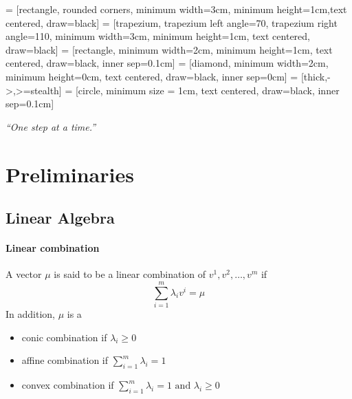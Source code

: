 
\usepackage{makecell}

\usetikzlibrary{shapes.geometric, arrows}
     = [rectangle, rounded corners, minimum width=3cm, minimum height=1cm,text centered, draw=black]
     = [trapezium, trapezium left angle=70, trapezium right angle=110, minimum width=3cm, minimum height=1cm, text centered, draw=black]
     = [rectangle, minimum width=2cm, minimum height=1cm, text centered, draw=black, inner sep=0.1cm]
     = [diamond, minimum width=2cm, minimum height=0cm, text centered, draw=black, inner sep=0cm]
     = [thick,->,>=stealth]
     = [circle, minimum size = 1cm, text centered, draw=black, inner sep=0.1cm]

\renewcommand{\docTitle}{Lecture 1 - Simplex Method}
\renewcommand{\docAuthor}{Lan Peng, Ph.D.}
\renewcommand{\docAffil}{School of Management, Shanghai University, Shanghai, China}

    \titleSec

    \begin{center}
        \textit{``One step at a time.''}
    \end{center}

    \section{Preliminaries}
        \subsection{Linear Algebra}
            \paragraph{Linear combination}
                A vector $\mu$ is said to be a linear combination of $v^1, v^2, \dots, v^m$ if
                \begin{equation*}
                    \sum_{i=1}^m\lambda_i v^i=\mu
                \end{equation*}
                In addition, $\mu$ is a 
                \begin{itemize}
                    \item conic combination if $\lambda_i \ge 0$
                    \item affine combination if $\sum_{i=1}^m \lambda_i =1$
                    \item convex combination if $\sum_{i=1}^m \lambda_i =1 \text{ and } \lambda_i \ge 0$
                \end{itemize}

